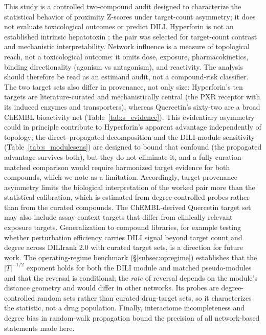 This study is a controlled two-compound audit designed to characterize the statistical behavior of proximity Z-scores under target-count asymmetry; it does not evaluate toxicological outcomes or predict DILI. Hyperforin is not an established intrinsic hepatotoxin \citep{LiverToxSJW}; the pair was selected for target-count contrast and mechanistic interpretability. Network influence is a measure of topological reach, not a toxicological outcome: it omits dose, exposure, pharmacokinetics, binding directionality (agonism vs antagonism), and reactivity. The analysis should therefore be read as an estimand audit, not a compound-risk classifier. The two target sets also differ in provenance, not only size: Hyperforin's ten targets are literature-curated and mechanistically central (the PXR receptor with its induced enzymes and transporters), whereas Quercetin's sixty-two are a broad ChEMBL bioactivity net (Table~\ref{tab:s_evidence}). This evidentiary asymmetry could in principle contribute to Hyperforin's apparent advantage independently of topology; the direct--propagated decomposition and the DILI-module sensitivity (Table~\ref{tab:s_modulesens}) are designed to bound that confound (the propagated advantage survives both), but they do not eliminate it, and a fully curation-matched comparison would require harmonized target evidence for both compounds, which we note as a limitation. Accordingly, target-provenance asymmetry limits the biological interpretation of the worked pair more than the statistical calibration, which is estimated from degree-controlled probes rather than from the curated compounds. The ChEMBL-derived Quercetin target set may also include assay-context targets that differ from clinically relevant exposure targets. Generalization to compound libraries, for example testing whether perturbation efficiency carries DILI signal beyond target count and degree across DILIrank 2.0 with curated target sets, is a direction for future work. The operating-regime benchmark (\S\ref{subsec:opregime}) establishes that the $|T|^{-1/2}$ exponent holds for both the DILI module and matched pseudo-modules and that the reversal is conditional; the \emph{rate} of reversal depends on the module's distance geometry and would differ in other networks. Its probes are degree-controlled random sets rather than curated drug-target sets, so it characterizes the statistic, not a drug population. Finally, interactome incompleteness and degree bias in random-walk propagation \citep{Cowen2017, Erten2011} bound the precision of all network-based statements made here.

